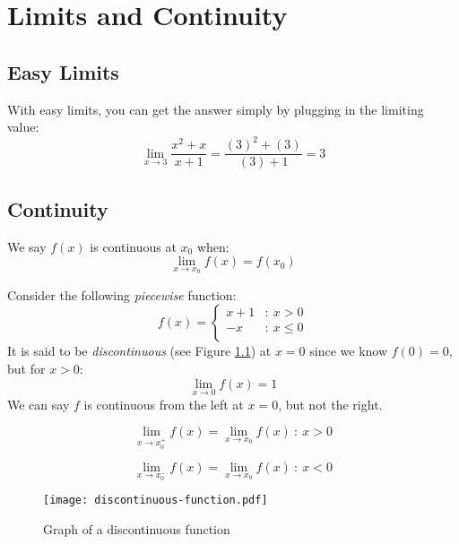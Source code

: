 \documentclass[../main.tex]{subfiles}
\begin{document}
\chapter{Limits and Continuity}
\section{Easy Limits}
With easy limits, you can get the answer simply by plugging in the 
limiting value:
\[ \lim_{x \to 3} \frac{x^2 + x}{x + 1} = \frac{(3)^2 + (3)}{(3) + 1} = 3 \]
\section{Continuity}
\begin{defn}
    We say $f(x)$ is continuous at $x_0$ when:
    \[ \lim_{x \to x_0} f(x) = f \left( x_0 \right) \]
    \label{def:continuity}
\end{defn}
\begin{exmp}
    Consider the following \emph{piecewise} function:
    \[
        f(x) = 
        \begin{cases} 
            x + 1   & :\ x > 0\\
            -x      & :\ x \leq 0\\
        \end{cases}
    \]
    It is said to be \emph{discontinuous} 
    (see Figure \ref{fig:discontinuous-function}) at $x = 0$ 
    since we know $f(0) = 0$, but for $x > 0$:
    \[ \lim_{x \to 0} f(x) = 1 \]
    We can say $f$ is continuous from the left at $x = 0$, 
    but not the right.
\end{exmp}
\begin{defn}
    \[ \lim_{x \to x_0^+} f(x) = \lim_{x \to x_0} f(x)\ :\ x > 0 \]
\end{defn}
\begin{defn}
    \[ \lim_{x \to x_0^-} f(x) = \lim_{x \to x_0} f(x)\ :\ x < 0 \]
\end{defn}
\begin{figure}[h]
    \centering
    \texttt{[image: discontinuous-function.pdf]}
    \caption{Graph of a discontinuous function}
    \label{fig:discontinuous-function}
\end{figure}
\end{document}
